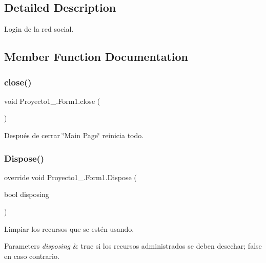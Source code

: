 \subsection{Detailed Description}
Login de la red social. 



\subsection{Member Function Documentation}
\mbox{\label{class_proyecto1__1096917_1_1_form1_a0bdf3e74bcdc4dbc9dd959f791668d42}} 
\subsubsection{\texorpdfstring{close()}{close()}}
{\footnotesize\ttfamily void Proyecto1\+\_.\+Form1.\+close (\begin{DoxyParamCaption}{ }\end{DoxyParamCaption})}



Después de cerrar \char`\"{}\+Main Page\char`\"{} reinicia todo. 

\mbox{\label{class_proyecto1__1096917_1_1_form1_acc2460d7f1237443a701fe741cbc183d}} 
\subsubsection{\texorpdfstring{Dispose()}{Dispose()}}
{\footnotesize\ttfamily override void Proyecto1\+\_.\+Form1.\+Dispose (\begin{DoxyParamCaption}\item[{bool}]{disposing }\end{DoxyParamCaption})\hspace{0.3cm}{\ttfamily [protected]}}



Limpiar los recursos que se estén usando. 


\begin{DoxyParams}{Parameters}
{\em disposing} & true si los recursos administrados se deben desechar; false en caso contrario.\\
\hline
\end{DoxyParams}
\mbox{\label{class_proyecto1__1096917_1_1_form1_a2c873349728e55828bbf9f2f1d3e2498}} 
